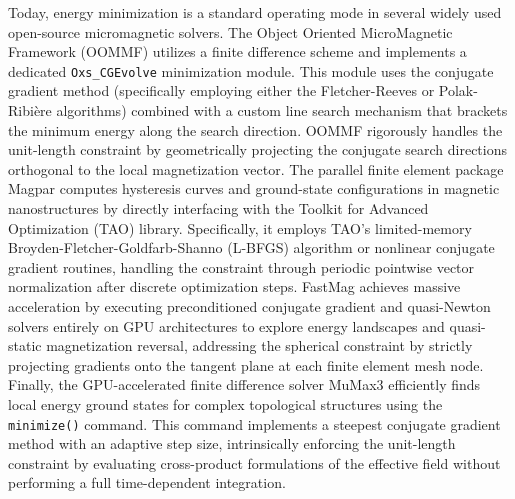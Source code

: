 \documentclass[10pt, a4paper, twocolumn]{article}
\begin{document}
Today, energy minimization is a standard operating mode in several widely used open-source micromagnetic solvers. The Object Oriented MicroMagnetic Framework (OOMMF) \cite{Donahue1999} utilizes a finite difference scheme and implements a dedicated \texttt{Oxs\_CGEvolve} minimization module. This module uses the conjugate gradient method (specifically employing either the Fletcher-Reeves or Polak-Ribi{\`e}re algorithms) combined with a custom line search mechanism that brackets the minimum energy along the search direction. OOMMF rigorously handles the unit-length constraint by geometrically projecting the conjugate search directions orthogonal to the local magnetization vector. The parallel finite element package Magpar \cite{Scholz2003} computes hysteresis curves and ground-state configurations in magnetic nanostructures by directly interfacing with the Toolkit for Advanced Optimization (TAO) library. Specifically, it employs TAO's limited-memory Broyden-Fletcher-Goldfarb-Shanno (L-BFGS) algorithm or nonlinear conjugate gradient routines, handling the constraint through periodic pointwise vector normalization after discrete optimization steps. FastMag \cite{Chang2011} achieves massive acceleration by executing preconditioned conjugate gradient and quasi-Newton solvers entirely on GPU architectures to explore energy landscapes and quasi-static magnetization reversal, addressing the spherical constraint by strictly projecting gradients onto the tangent plane at each finite element mesh node. Finally, the GPU-accelerated finite difference solver MuMax3 \cite{Vansteenkiste2014} efficiently finds local energy ground states for complex topological structures using the \texttt{minimize()} command. This command implements a steepest conjugate gradient method with an adaptive step size, intrinsically enforcing the unit-length constraint by evaluating cross-product formulations of the effective field without performing a full time-dependent integration.
\end{document}
